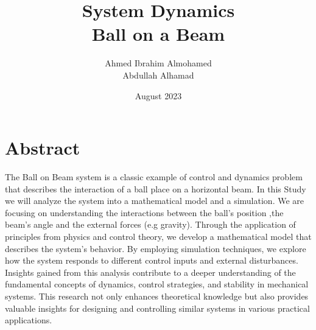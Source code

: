 \documentclass{article}
\title{System Dynamics \\ Ball on a Beam}
\author{Ahmed Ibrahim Almohamed \\ Abdullah Alhamad }
\date{August 2023}
\begin{document}
\tableofcontents
\maketitle
\makenomenclature
\section{Abstract}

The Ball on Beam system is a classic example of control and dynamics problem that describes
the interaction of a ball place on a horizontal beam.
In this Study we will analyze the system into a mathematical model and a simulation.
We are focusing on understanding the interactions between the ball's position ,the beam's angle
and the external forces (e.g gravity).
Through the application of principles from physics and control theory,
we develop a mathematical model that describes the system's behavior.
By employing simulation techniques, we explore how the system responds to different control inputs and external disturbances.
Insights gained from this analysis contribute to a deeper understanding of the fundamental concepts of dynamics, control strategies, and stability in mechanical systems.
This research not only enhances theoretical knowledge but also provides valuable insights for designing and controlling similar systems in various practical applications.

\newpage
\printnomenclature
\newpage
\end{document}
